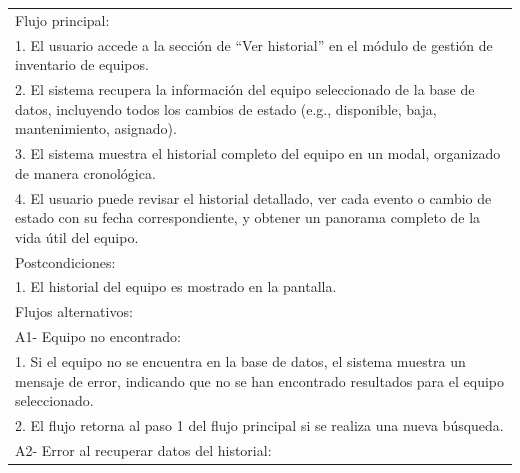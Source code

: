 \documentclass[stu, 12pt, letterpaper, donotrepeattitle, floatsintext, natbib]{apa7}
\begin{document}
\begin{longtable}{@{} p{16.5cm} @{}}
    Flujo principal:                                                                                                                                                                    \\
    1. El usuario accede a la sección de ``Ver historial'' en el módulo de gestión de inventario de equipos.                                                                            \\
    2. El sistema recupera la información del equipo seleccionado de la base de datos, incluyendo todos los cambios de estado (e.g., disponible, baja, mantenimiento, asignado).        \\
    3. El sistema muestra el historial completo del equipo en un modal, organizado de manera cronológica.                                                                               \\
    4. El usuario puede revisar el historial detallado, ver cada evento o cambio de estado con su fecha correspondiente, y obtener un panorama completo de la vida útil del equipo.     \\ \midrule
    Postcondiciones:                                                                                                                                                                    \\
    1. El historial del equipo es mostrado en la pantalla.                                                                                                                              \\ \midrule
    Flujos alternativos:                                                                                                                                                                \\
    A1- Equipo no encontrado:                                                                                                                                                           \\
    \hspace{1cm}1. Si el equipo no se encuentra en la base de datos, el sistema muestra un mensaje de error, indicando que no se han encontrado resultados para el equipo seleccionado. \\
    \hspace{1cm}2. El flujo retorna al paso 1 del flujo principal si se realiza una nueva búsqueda.                                                                                     \\
    A2- Error al recuperar datos del historial:                                                                                                                                         \\

\end{longtable}
\end{document}
